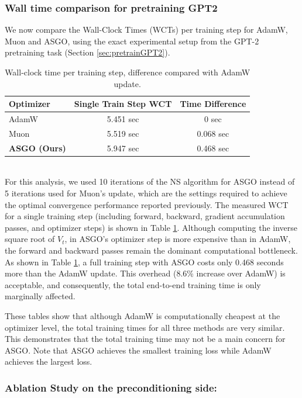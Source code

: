 \documentclass{article}
\theoremstyle{remark}
\begin{document}
\subsubsection{Wall time comparison for pretraining GPT2}

We now compare the Wall-Clock Times (WCTs) per training step for AdamW, Muon and ASGO, using the exact experimental setup from the GPT-2 pretraining task (Section \ref{sec:pretrainGPT2}).
    \begin{table}[h!]
    \centering
    \caption{Wall-clock time per training step, difference compared with AdamW update.}
    \label{table:perstepWCT}
    \begin{tabular}{lcc}
    \toprule
    \textbf{Optimizer} & \textbf{Single Train Step WCT} & \textbf{Time Difference} \\
    \midrule
    AdamW & 5.451 sec & 0 sec \\
    Muon  & 5.519 sec & 0.068 sec \\
    \textbf{ASGO (Ours)} & 5.947 sec & 0.468 sec  \\
    \bottomrule
    \end{tabular}
    \end{table}\\
For this analysis, we used 10 iterations of the NS algorithm for ASGO instead of 5 iterations used for Muon's update, which are the settings required to achieve the optimal convergence performance reported previously. The measured WCT for a single training step (including forward, backward, gradient accumulation passes, and optimizer steps) is shown in Table \ref{table:perstepWCT}. Although computing the inverse square root of $V_t$, in ASGO's optimizer step is more expensive than in AdamW, the forward and backward passes remain the dominant computational bottleneck.
As shown in Table \ref{table:perstepWCT}, a full training step with ASGO costs only 0.468 seconds more than the AdamW update. This overhead (8.6\% increase over AdamW) is acceptable, and consequently, the total end-to-end training time is only marginally affected.


These tables show that although AdamW is computationally cheapest at the optimizer level, the total training times for all three methods are very similar. This demonstrates that the total training time may not be a main concern for ASGO. Note that ASGO achieves the smallest training loss while AdamW achieves the largest loss. 

\subsubsection{Ablation Study on the preconditioning side:\label{sec:ablation_side}}
\end{document}
